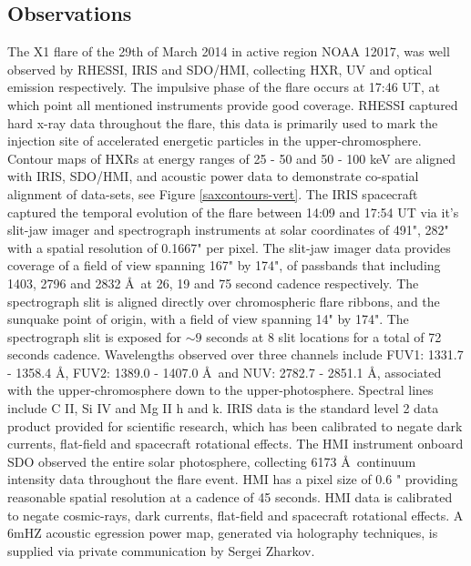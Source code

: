 \subsection{Observations}
The X1 flare of the 29th of March 2014 in active region NOAA 12017, was well observed by RHESSI, IRIS and SDO/HMI, collecting HXR, UV and optical emission respectively. The impulsive phase of the flare occurs at 17:46 UT, at which point all mentioned instruments provide good coverage. RHESSI captured hard x-ray data throughout the flare, this data is primarily used to mark the injection site of accelerated energetic particles in the upper-chromosphere. Contour maps of HXRs at energy ranges of 25 - 50 and 50 - 100 keV are aligned with IRIS, SDO/HMI, and acoustic power data to demonstrate co-spatial alignment of data-sets, see Figure \ref{saxcontours-vert}. The IRIS spacecraft captured the temporal evolution of the flare between 14:09 and 17:54 UT via it's slit-jaw imager and spectrograph instruments at solar coordinates of 491", 282" with a spatial resolution of 0.1667" per pixel. The slit-jaw imager data provides coverage of a field of view spanning 167" by 174", of passbands that including 1403, 2796 and 2832 \AA\ at 26, 19 and 75 second cadence respectively. The spectrograph slit is aligned directly over chromospheric flare ribbons, and the sunquake point of origin, with a field of view spanning 14" by 174". The spectrograph slit is exposed for $\sim9$ seconds at 8 slit locations for a total of 72 seconds cadence. Wavelengths observed over three channels include FUV1: 1331.7 - 1358.4 \AA, FUV2: 1389.0 - 1407.0 \AA\ and NUV: 2782.7 - 2851.1 \AA, associated with the upper-chromosphere down to the upper-photosphere. Spectral lines include C II, Si IV and Mg II h and k. IRIS data is the standard level 2 data product provided for scientific research, which has been calibrated to negate dark currents, flat-field and spacecraft rotational effects. The HMI instrument onboard SDO observed the entire solar photosphere, collecting 6173 \AA\ continuum intensity data throughout the flare event. HMI has a pixel size of 0.6 " providing reasonable spatial resolution at a cadence of 45 seconds. HMI data is calibrated to negate cosmic-rays, dark currents, flat-field and spacecraft rotational effects. A 6mHZ acoustic egression power map, generated via holography techniques, is supplied via private communication by Sergei Zharkov.

